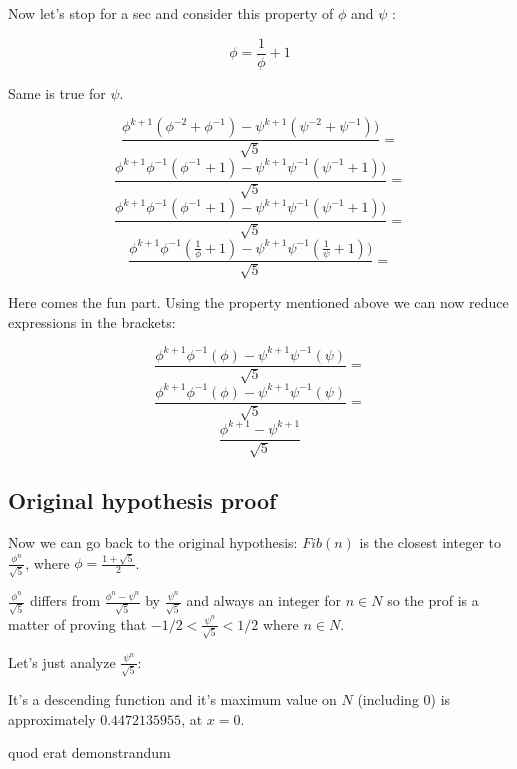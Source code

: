 \documentclass{article}
\begin{document}
Now let's stop for a sec and consider this property of \(\phi\) and \(\psi\) :

\[ \phi = \frac{1}{\phi} + 1 \]

Same is true for \(\psi\).

\[ \frac{\phi^{k + 1} (\phi^{-2} + \phi^{-1}) - \psi^{k + 1}(\psi^{-2} + \psi^{-1}))}{\sqrt 5} = \]
\[ \frac{\phi^{k + 1} \phi^{-1} (\phi^{-1} + 1) - \psi^{k + 1} \psi^{-1} (\psi^{-1} + 1))}{\sqrt 5} = \]
\[ \frac{\phi^{k + 1} \phi^{-1} (\phi^{-1} + 1) - \psi^{k + 1} \psi^{-1} (\psi^{-1} + 1))}{\sqrt 5} = \]
\[ \frac{\phi^{k + 1} \phi^{-1} (\frac{1}{\phi} + 1) - \psi^{k + 1} \psi^{-1} (\frac{1}{\psi} + 1))}{\sqrt 5} = \]

Here comes the fun part. Using the property mentioned above we can now reduce expressions in the brackets:

\[ \frac{\phi^{k + 1} \phi^{-1} (\phi) - \psi^{k + 1} \psi^{-1} (\psi)}{\sqrt 5} = \]
\[ \frac{\phi^{k + 1} \phi^{-1} (\phi) - \psi^{k + 1} \psi^{-1} (\psi)}{\sqrt 5} = \]
\[ \frac{\phi^{k + 1} - \psi^{k + 1}}{\sqrt 5} \]

\subsection{Original hypothesis proof}

Now we can go back to the original hypothesis: \(Fib(n)\) is the closest integer to \(\frac{\phi^n}{\sqrt 5}\), where \(\phi = \frac{1 + \sqrt 5}{2}\).

\( \frac{\phi^n}{\sqrt 5} \) differs from \( \frac{\phi^n - \psi^n}{\sqrt 5}\) by \( \frac{\psi^n}{\sqrt 5} \) and always an integer for \( n \in N \) so the prof is a matter of proving that \( - 1/2 < \frac{\psi^n}{\sqrt 5} < 1/2 \) where \( n \in N \).

Let's just analyze \( \frac{\psi^n}{\sqrt 5} \):


It's a descending function and it's maximum value on \(N\) (including 0) is approximately \( 0.4472135955 \), at \(x = 0\).

\par
quod erat demonstrandum
\end{document}
